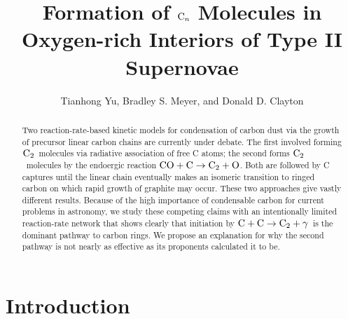 \documentclass[manuscript]{aastex}
\newcommand{\ctwo}{{\rm C}_2}
\newcommand{\cenn}{{\rm C}_n}
\newcommand{\twoctoctwo}{${\rm C} + {\rm C} \to \ctwo + \gamma$}
\newcommand{\coctoctwo}{${\rm CO} + {\rm C} \to \ctwo + {\rm O}$}
\begin{document}
\title{Formation of $\cenn$ Molecules in Oxygen-rich Interiors of Type II
Supernovae}

\author{Tianhong Yu, Bradley S. Meyer, and Donald D. Clayton}

\begin{abstract}
Two reaction-rate-based kinetic models for condensation of carbon dust via the
growth of precursor linear carbon chains are currently under debate. The first
involved forming $\ctwo$\ molecules via radiative association of free C
atoms; the second forms $\ctwo$\ molecules by the endoergic reaction
\coctoctwo. Both are
followed by C captures until the linear chain eventually makes an isomeric
transition to ringed carbon on which rapid growth of graphite may occur.
These two approaches give vastly different results. Because of the high
importance of condensable carbon for current problems in astronomy,
we study these competing claims with an intentionally limited reaction-rate
network that shows clearly that initiation by
\twoctoctwo\ is the dominant
pathway to carbon rings. We propose an explanation for why the second pathway
is not nearly as effective as its proponents calculated it to be.
\end{abstract}


\section{Introduction}
\end{document}
